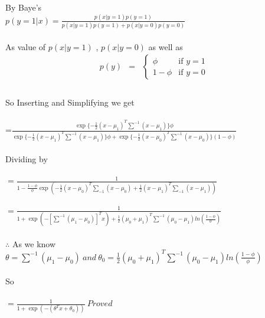 \newcommand\tab[1][1cm]{\hspace*{#1}}
\begin{answer}
	
	By Baye's \\
	
	\tab$p(y=1|x) = \frac{p(x|y = 1)p(y=1)}{p(x|y = 1)p(y=1) + p(x|y = 0)p(y=0)}$ \\ \\ 
	As value of $ p(x|y = 1)$ , $p(x|y = 0)$ as well as \\
	\begin{eqnarray*}
	p(y) &=& \begin{cases}
	\phi & \mbox{if~} y = 1 \\
	1 - \phi & \mbox{if~} y = 0 \end{cases} \\
	\end{eqnarray*} \\ 
	So Inserting and Simplifying we get \\ \\ 
	\tab[2.25cm]=$ \frac{\exp \{-\frac{1}{2}(x-\mu_1)^T\sum^{-1}(x-\mu_1)\}\phi}{\exp \{-\frac{1}{2}(x-\mu_1)^T\sum^{-1}(x-\mu_1)\}\phi + \exp \{-\frac{1}{2}(x-\mu_0)^T\sum^{-1}(x-\mu_0)\}(1-\phi)}$ \\ \\ 
	Dividing by \\ \\ 
	\tab[2.25cm]$=\frac{1}{1-\frac{1-\phi}{\phi}\exp(-\frac{1}{2}(x-\mu_0)^T\sum_{-1}(x-\mu_0)+\frac{1}{2}(x-\mu_1)^T\sum_{-1}(x-\mu_1))}$ \\ \\
	\tab[2.25cm]$=\frac{1}{1 + \exp(-[\sum^{-1}(\mu_1-\mu_0)]^Tx)+\frac{1}{2}(\mu_0+\mu_1)^T\sum^{-1}(\mu_0-\mu_1) ln(\frac{1-\phi}{\phi})}$ \\  \\
	$\therefore$ As we know $\theta = \sum^{-1}(\mu_1-\mu_0)\ and \ \theta_0 = \frac{1}{2}(\mu_0+\mu_1)^T\sum^{-1}(\mu_0-\mu_1) ln(\frac{1-\phi}{\phi})$ \\ \\
	So \\ \\
	\tab[2.25cm]$= \frac{1}{1 + \exp(-(\theta^T x + \theta_0))} \ Proved$
	
\end{answer}
